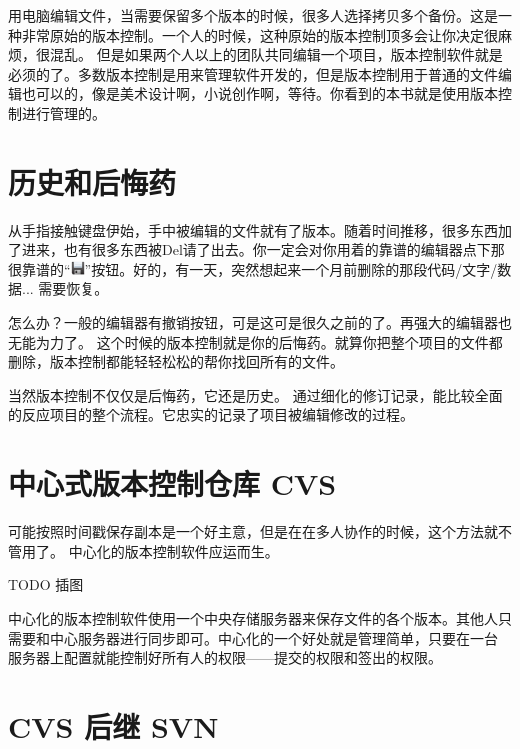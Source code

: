 
用电脑编辑文件，当需要保留多个版本的时候，很多人选择拷贝多个备份。这是一种非常原始的版本控制。一个人的时候，这种原始的版本控制顶多会让你决定很麻烦，很混乱。
但是如果两个人以上的团队共同编辑一个项目，版本控制软件就是必须的了。多数版本控制是用来管理软件开发的，但是版本控制用于普通的文件编辑也可以的，像是美术设计啊，小说创作啊，等待。你看到的本书就是使用版本控制进行管理的。

\section{历史和后悔药}

从手指接触键盘伊始，手中被编辑的文件就有了版本。随着时间推移，很多东西加了进来，也有很多东西被Del请了出去。你一定会对你用着的靠谱的编辑器点下那很靠谱的“\includegraphics[width=1em]{pics/document-save.png}”按钮。好的，有一天，突然想起来一个月前删除的那段代码/文字/数据... 需要恢复。

怎么办？一般的编辑器有撤销按钮，可是这可是很久之前的了。再强大的编辑器也无能为力了。
这个时候的版本控制就是你的后悔药。就算你把整个项目的文件都删除，版本控制都能轻轻松松的帮你找回所有的文件。

当然版本控制不仅仅是后悔药，它还是历史。
通过细化的修订记录，能比较全面的反应项目的整个流程。它忠实的记录了项目被编辑修改的过程。


\section{中心式版本控制仓库 CVS}

可能按照时间戳保存副本是一个好主意，但是在在多人协作的时候，这个方法就不管用了。
中心化的版本控制软件应运而生。

TODO 插图

中心化的版本控制软件使用一个中央存储服务器来保存文件的各个版本。其他人只需要和中心服务器进行同步即可。中心化的一个好处就是管理简单，只要在一台 服务器上配置就能控制好所有人的权限——提交的权限和签出的权限。


\section{CVS 后继 SVN}
